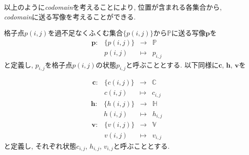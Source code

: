 以上のように\textit{codomain}を考えることにより, 位置が含まれる各集合から, \textit{codomain}に送る写像を考えることができる.
\begin{definition}[写像$\bm{p}$, $\bm{c}$, $\bm{h}$, $\bm{v}$]\label{definition:Mapping}
  格子点$p(i,j)$を過不足なくふくむ集合$\{p(i,j)\}$から$\mathbb{P}$に送る写像$\bm{p}$を
  \begin{equation*}
    \begin{array}{rccc}
      \bm{p}\colon & \{p(i,j)\} & \longrightarrow & \mathbb{P} \\
                   & p(i,j)     & \longmapsto     & p_{i,j}
    \end{array}
  \end{equation*}
  と定義し, $p_{i,j}$を格子点$p(i,j)$の状態$p_{i,j}$と呼ぶこととする.
  以下同様に$\bm{c}$, $\bm{h}$, $\bm{v}$を

  \begin{equation*}
    \begin{array}{rccc}
      \bm{c}\colon & \{c(i,j)\} & \longrightarrow & \mathbb{C} \\
                   & c(i,j)     & \longmapsto     & c_{i,j}
    \end{array}
  \end{equation*}
  \begin{equation*}
    \begin{array}{rccc}
      \bm{h}\colon & \{h(i,j)\} & \longrightarrow & \mathbb{H} \\
                   & h(i,j)     & \longmapsto     & h_{i,j}
    \end{array}
  \end{equation*}
  \begin{equation*}
    \begin{array}{rccc}
      \bm{v}\colon & \{v(i,j)\} & \longrightarrow & \mathbb{V} \\
                   & v(i,j)     & \longmapsto     & v_{i,j}
    \end{array}
  \end{equation*}
  と定義し, それぞれ状態$c_{i,j}$, $h_{i,j}$, $v_{i,j}$と呼ぶこととする.


\end{definition}
